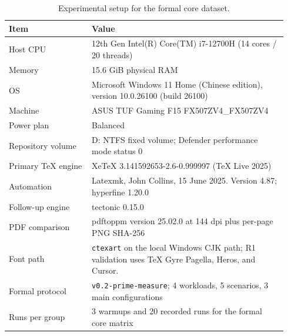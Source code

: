 \begin{table}[t]
\centering
\caption{Experimental setup for the formal core dataset.}
\label{tab:setup}
\small
\begin{tabular}{p{0.28\linewidth}p{0.66\linewidth}}
\toprule
Item & Value \\
\midrule
Host CPU & 12th Gen Intel(R) Core(TM) i7-12700H (14 cores / 20 threads) \\
Memory & 15.6 GiB physical RAM \\
OS & Microsoft Windows 11 Home (Chinese edition), version 10.0.26100 (build 26100) \\
Machine & ASUS TUF Gaming F15 FX507ZV4\_FX507ZV4 \\
Power plan & Balanced \\
Repository volume & D: NTFS fixed volume; Defender performance mode status 0 \\
Primary TeX engine & XeTeX 3.141592653-2.6-0.999997 (TeX Live 2025) \\
Automation & Latexmk, John Collins, 15 June 2025. Version 4.87; hyperfine 1.20.0 \\
Follow-up engine & tectonic 0.15.0 \\
PDF comparison & pdftoppm version 25.02.0 at 144 dpi plus per-page PNG SHA-256 \\
Font path & \texttt{ctexart} on the local Windows CJK path; R1 validation uses TeX Gyre Pagella, Heros, and Cursor. \\
Formal protocol & \texttt{v0.2-prime-measure}; 4 workloads, 5 scenarios, 3 main configurations \\
Runs per group & 3 warmups and 20 recorded runs for the formal core matrix \\
\bottomrule
\end{tabular}
\end{table}
